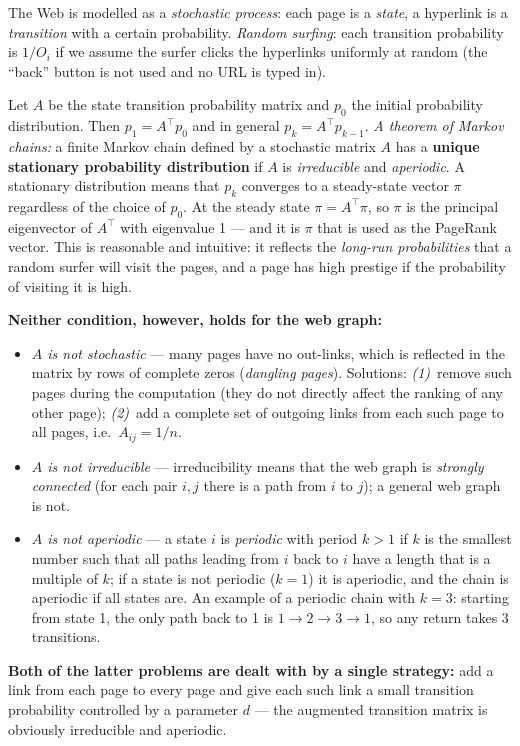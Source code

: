 \documentclass[11pt,a4paper]{article}
\theoremstyle{definition}
\providecommand{\uv}[1]{``#1''}
\begin{document}
\begin{defbox}
The Web is modelled as a \emph{stochastic process}: each page is a \emph{state}, a hyperlink is a
\emph{transition} with a certain probability. \emph{Random surfing}: each transition probability is
$1/O_i$ if we assume the surfer clicks the hyperlinks uniformly at random (the \uv{back} button is not
used and no URL is typed in).

Let $A$ be the state transition probability matrix and $p_0$ the initial probability distribution.
Then $p_1=A^{\!\top}p_0$ and in general $p_k=A^{\!\top}p_{k-1}$. \emph{A theorem of Markov chains:} a
finite Markov chain defined by a stochastic matrix $A$ has a \textbf{unique stationary probability
distribution} if $A$ is \emph{irreducible} and \emph{aperiodic}. A stationary distribution means that
$p_k$ converges to a steady-state vector $\pi$ regardless of the choice of $p_0$. At the steady state
$\pi=A^{\!\top}\pi$, so $\pi$ is the principal eigenvector of $A^{\!\top}$ with eigenvalue 1 --- and
it is $\pi$ that is used as the PageRank vector. This is reasonable and intuitive: it reflects the
\emph{long-run probabilities} that a random surfer will visit the pages, and a page has high prestige
if the probability of visiting it is high.

\textbf{Neither condition, however, holds for the web graph:}
\begin{itemize}
\item \emph{$A$ is not stochastic} --- many pages have no out-links, which is reflected in the matrix
      by rows of complete zeros (\emph{dangling pages}). Solutions: \emph{(1)}~remove such pages
      during the computation (they do not directly affect the ranking of any other page);
      \emph{(2)}~add a complete set of outgoing links from each such page to all pages, i.e.\
      $A_{ij}=1/n$.
\item \emph{$A$ is not irreducible} --- irreducibility means that the web graph is \emph{strongly
      connected} (for each pair $i,j$ there is a path from $i$ to $j$); a general web graph is not.
\item \emph{$A$ is not aperiodic} --- a state $i$ is \emph{periodic} with period $k>1$ if $k$ is the
      smallest number such that all paths leading from $i$ back to $i$ have a length that is a
      multiple of $k$; if a state is not periodic ($k=1$) it is aperiodic, and the chain is aperiodic
      if all states are. An example of a periodic chain with $k=3$: starting from state 1, the only
      path back to 1 is $1\to2\to3\to1$, so any return takes 3 transitions.
\end{itemize}
\textbf{Both of the latter problems are dealt with by a single strategy:} add a link from each page to
every page and give each such link a small transition probability controlled by a parameter $d$ ---
the augmented transition matrix is obviously irreducible and aperiodic.
\end{defbox}
\end{document}
